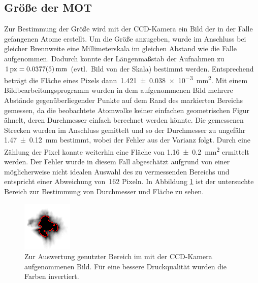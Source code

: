 \documentclass[11pt, a4paper]{article}
\numberwithin{equation}{section}
\newcommand{\korr}[1]{{\color{red}(#1)}}
\begin{document}
\subsection{Größe der MOT}
Zur Bestimmung der Größe wird mit der CCD-Kamera ein Bild der in der Falle gefangenen Atome erstellt.
Um die Größe anzugeben, wurde im Anschluss bei gleicher Brennweite eine Millimeterskala im gleichen Abstand wie die Falle aufgenommen.
Dadurch konnte der Längenmaßstab der Aufnahmen zu~$\SI{1}{px}=\SI{0,0377+-0,0005}{mm}$ \korr{evtl.\ Bild von der Skala} bestimmt werden.
Entsprechend beträgt die Fläche eines Pixels dann~\SI{1.421+-0.038e-3}{mm^2}.
Mit einem Bildbearbeitungsprogramm wurden in dem aufgenommenen Bild mehrere Abstände gegenüberliegender Punkte auf dem Rand des markierten Bereichs gemessen, da die beobachtete Atomwolke keiner einfachen geometrischen Figur ähnelt, deren Durchmesser einfach berechnet werden könnte.
Die gemessenen Strecken wurden im Anschluss gemittelt und so der Durchmesser zu ungefähr \SI{1,47+-0,12}{mm} bestimmt, wobei der Fehler aus der Varianz folgt.
Durch eine Zählung der Pixel konnte weiterhin eine Fläche von \SI{1,16+-0,2}{mm^2} ermittelt werden.
Der Fehler wurde in diesem Fall abgeschätzt aufgrund von einer möglicherweise nicht idealen Auswahl des zu vermessenden Bereichs und entspricht einer Abweichung von~\num{162} Pixeln.
In Abbildung \ref{fig:mot_groesse} ist der untersuchte Bereich zur Bestimmung von Durchmesser und Fläche zu sehen.
\begin{figure}[h]
	\centering
	\includegraphics[width=.7\textwidth]{./figures/size_inverted.png}
	\caption{Zur Auswertung genutzter Bereich im mit der CCD-Kamera aufgenommenen Bild. Für eine bessere Druckqualität wurden die Farben invertiert.}
	\label{fig:mot_groesse}
\end{figure}
\end{document}
